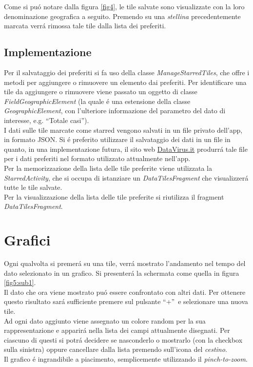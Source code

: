 \documentclass{article}
\newcommand{\quotes}[1]{``#1''}
\begin{document}
    Come si puó notare dalla figura \ref{fig4}, le tile salvate sono visualizzate con la loro denominazione geografica a seguito.
    Premendo su una \emph{stellina} precedentemente marcata verrá rimossa tale tile dalla lista dei preferiti.

    \subsection{Implementazione}
    Per il salvataggio dei preferiti si fa uso della classe \emph{ManageStarredTiles}, che offre i metodi per aggiungere o rimuovere un elemento dai preferiti. 
    Per identificare una tile da aggiungere o rimuovere viene passato un oggetto di classe \emph{FieldGeographicElement} (la quale é una estensione della classe \emph{GeographicElement}, con l'ulteriore informazione del parametro del dato di interesse, e.g. \quotes{Totale casi}).
    \\
    I dati sulle tile marcate come starred vengono salvati in un file privato dell'app, in formato JSON. 
    Si é preferito utilizzare il salvataggio dei dati in un file in quanto, in una implementazione futura, il sito web \href{https://datavirus.it}{DataVirus.it} produrrá tale file per i dati preferiti nel formato utilizzato attualmente nell'app.
    \\
    Per la memorizzazione della lista delle tile preferite viene utilizzata la \emph{StarredActivity}, che si occupa di istanziare un \emph{DataTilesFragment} che visualizzerá tutte le tile salvate.
    \\
    Per la visualizzazione della lista delle tile preferite si riutilizza il fragment \emph{DataTilesFragment}.

    \section{Grafici}
    Ogni qualvolta si premerá su una tile, verrá mostrato l'andamento nel tempo del dato selezionato in un grafico.
    Si presenterá la schermata come quella in figura \ref{fig5:sub1}.
    \\
    Il dato che ora viene mostrato puó essere confrontato con altri dati. Per ottenere questo risultato sará sufficiente premere sul pulsante \quotes{+} e selezionare una nuova tile.
    \\
    Ad ogni dato aggiunto viene assegnato un colore random per la sua rappresentazione e apparirá nella lista dei campi attualmente disegnati. 
    Per ciascuno di questi si potrá decidere se nasconderlo o mostrarlo (con la checkbox sulla sinistra) oppure cancellare dalla lista premendo sull'icona del \emph{cestino}.
    \\
    Il grafico é ingrandibile a piacimento, semplicemente utilizzando il \emph{pinch-to-zoom}.
\end{document}
